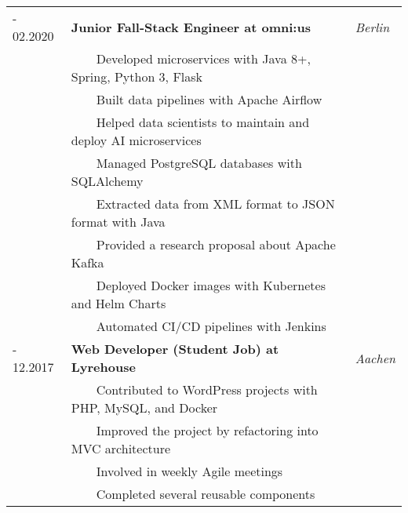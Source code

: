 \documentclass{article}
\newcommand{\tabitem}{~~\llap{\textbullet}~~}
\begin{document}
\begin{tabularx}{\textwidth}{
        >{\hsize=0.5\hsize}X
        >{\hsize=2\hsize}X
        >{\raggedleft\arraybackslash\hsize=0.5\hsize}X
    }
    08.2018 - 02.2020 & \textbf{Junior Fall-Stack Engineer at omni:us}                                                    & \textit{Berlin} \\[4pt]
                      & \tabitem Developed microservices with Java 8+, Spring, Python 3, Flask                                              \\
                      & \tabitem Built data pipelines with Apache Airflow                                                                   \\
                      & \tabitem Helped data scientists to maintain and deploy AI microservices                                             \\
                      & \tabitem Managed PostgreSQL databases with SQLAlchemy                                                               \\
                      & \tabitem Extracted data from XML format to JSON format with Java                                                    \\
                      & \tabitem Provided a research proposal about Apache Kafka                                                            \\
                      & \tabitem Deployed Docker images with Kubernetes and Helm Charts                                                     \\
                      & \tabitem Automated CI/CD pipelines with Jenkins                                                                     \\[8pt]

    02.2017 - 12.2017 & \textbf{Web Developer (Student Job) at Lyrehouse}                                                 & \textit{Aachen} \\[4pt]
                      & \tabitem Contributed to WordPress projects with PHP, MySQL, and Docker                                              \\
                      & \tabitem Improved the project by refactoring into MVC architecture                                                  \\
                      & \tabitem Involved in weekly Agile meetings                                                                          \\
                      & \tabitem Completed several reusable components
\end{tabularx}
\end{document}
